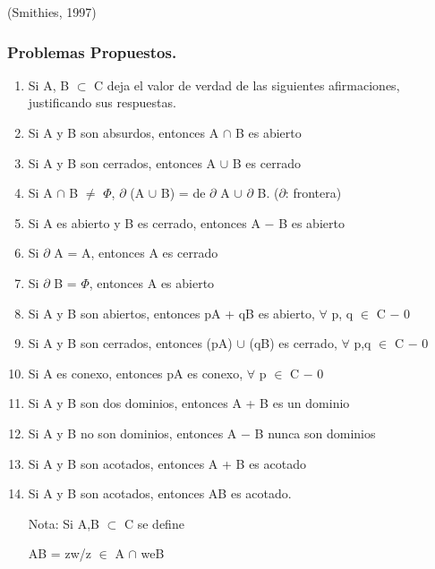 \documentclass[a4paper,12pt]{article}
\begin{document}
(Smithies, 1997)

\subsubsection{Problemas Propuestos.}

\begin{enumerate}
\item Si A, B $\subset$ C deja el valor de verdad de las siguientes afirmaciones, justificando sus respuestas.

\item Si A y B son absurdos, entonces A $\cap$ B es abierto

\item Si A y B son cerrados, entonces A $\cup$ B es cerrado

\item Si A $\cap$ B $\neq$ $\Phi$, $\partial$ (A $\cup$ B) = de $\partial$ A $\cup$ $\partial$ B. ($\partial$: frontera)

\item Si A es abierto y B es cerrado, entonces A $-$ B es abierto

\item Si $\partial$ A = A, entonces A es cerrado

\item Si $\partial$ B = $\Phi$, entonces A es abierto

\item Si A y B son abiertos, entonces pA + qB es abierto, $\forall$ p, q $\in$ C $-$ {0}

\item Si A y B son cerrados, entonces (pA) $\cup$ (qB) es cerrado, $\forall$ p,q $\in$ C $-$ {0}

\item Si A es conexo, entonces pA es conexo, $\forall$ p $\in$ C $-$ {0}

\item Si A y B son dos dominios, entonces A + B es un dominio

\item Si A y B no son dominios, entonces A $-$ B nunca son dominios

\item Si A y B son acotados, entonces A + B es acotado

\item Si A y B son acotados, entonces AB es acotado.

Nota: Si A,B $\subset$ C se define

AB = {zw/z $\in$ A $\cap$ weB}


\end{enumerate}
\end{document}
